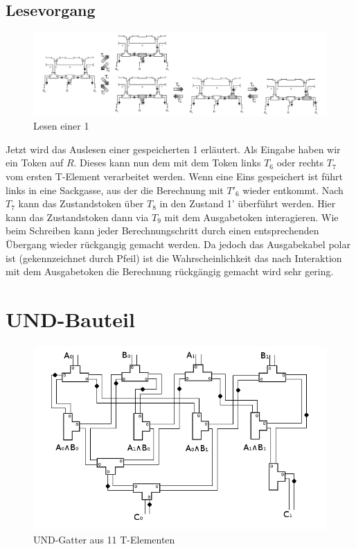 \documentclass[11pt,a4paper]{article}
\begin{document}
\subsection{Lesevorgang}

\begin{figure}[h]
      \includegraphics[width=14cm]{bilder/read1Mem.png} 
      \caption{Lesen einer 1}
\end{figure}

Jetzt wird das Auslesen einer gespeicherten 1 erläutert.
%
Als Eingabe haben wir ein Token auf $ R $.
%
Dieses kann nun dem mit dem Token links $ T_{6} $ oder rechts $ T_{7} $
vom ersten T-Element verarbeitet werden.
%
Wenn eine Eins gespeichert ist führt links in eine Sackgasse, aus der
die Berechnung mit $ T'_{6} $ wieder entkommt.
%
Nach $ T_{7} $ kann das Zustandstoken über $ T_{8} $ in den Zustand 1'
überführt werden. 
%
Hier kann das Zustandstoken dann via $ T_{9} $ mit dem 
Ausgabetoken interagieren.
%
Wie beim Schreiben kann jeder Berechnungschritt durch einen 
entsprechenden Übergang wieder rückgangig gemacht werden.
%
Da jedoch das Ausgabekabel polar ist (gekennzeichnet durch Pfeil)
ist die Wahrscheinlichkeit das nach Interaktion mit dem Ausgabetoken die 
Berechnung rückgängig gemacht wird sehr gering.



\section{UND-Bauteil}

\begin{figure}[h]
    \centering
    \includegraphics[width=12cm]{bilder/UndUnd.png}
    \caption{UND-Gatter aus 11 T-Elementen}
\end{figure}    
\end{document}
